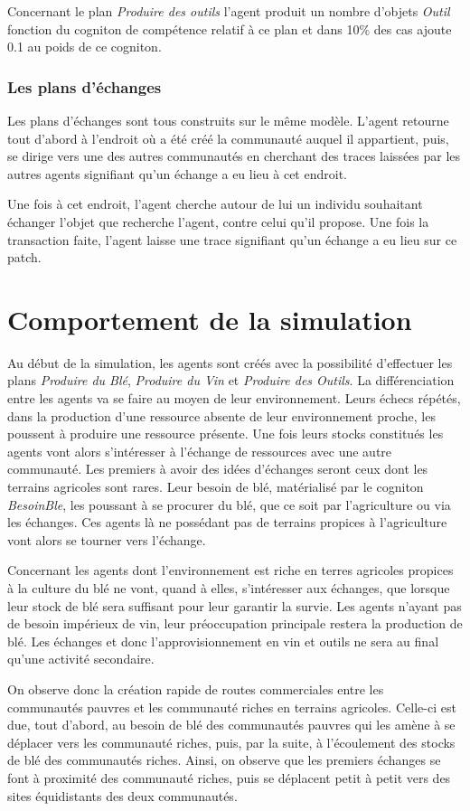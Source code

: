 \documentclass[a4paper,oneside,12 pt]{article}
\begin{document}
Concernant le plan \textit{Produire des outils} l'agent produit un nombre d'objets \textit{Outil} fonction du cogniton de compétence relatif à ce plan et dans 10\% des cas ajoute 0.1 au poids de ce cogniton.

\subsubsection{Les plans d'échanges}
	Les plans d'échanges sont tous construits sur le même modèle. L'agent retourne tout d'abord à l'endroit où a été créé la communauté auquel il appartient, puis, se dirige vers une des autres communautés en cherchant des traces laissées par les autres agents signifiant qu'un échange a eu lieu à cet endroit. 
	
	Une fois à cet endroit, l'agent cherche autour de lui un individu souhaitant échanger l'objet que recherche l'agent, contre celui qu'il propose. Une fois la transaction faite, l'agent laisse une trace signifiant qu'un échange a eu lieu sur ce patch.

\clearpage
\section{Comportement de la simulation}
	Au début de la simulation, les agents sont créés avec la possibilité d'effectuer les plans \textit{Produire du Blé}, \textit{Produire du Vin} et \textit{Produire des Outils}. La différenciation entre les agents va se faire au moyen de leur environnement. Leurs échecs répétés, dans la production d'une ressource absente de leur environnement proche, les poussent à produire une ressource présente. Une fois leurs stocks constitués les agents vont alors s'intéresser à l'échange de ressources avec une autre communauté. Les premiers à avoir des idées d'échanges seront ceux dont les terrains agricoles sont rares. Leur besoin de blé, matérialisé par le cogniton \textit{BesoinBle}, les poussant à se procurer du blé, que ce soit par l'agriculture ou via les échanges. Ces agents là ne possédant pas de terrains propices à l'agriculture vont alors se tourner vers l'échange. 
	
	Concernant les agents dont l'environnement est riche en terres agricoles propices à la culture du blé ne vont, quand à elles, s'intéresser aux échanges, que lorsque leur stock de blé sera suffisant pour leur garantir la survie. Les agents n'ayant pas de besoin impérieux de vin, leur préoccupation principale restera la production de blé. Les échanges et donc l'approvisionnement en vin et outils ne sera au final qu'une activité secondaire.
	
	On observe donc la création rapide de routes commerciales entre les communautés pauvres et les communauté riches en terrains agricoles. Celle-ci est due, tout d'abord, au besoin de blé des communautés pauvres qui les amène à se déplacer vers les communauté riches, puis, par la suite, à l'écoulement des stocks de blé des communautés riches. Ainsi, on observe que les premiers échanges se font à proximité des communauté riches, puis se déplacent petit à petit vers des sites équidistants des deux communautés.
\end{document}

